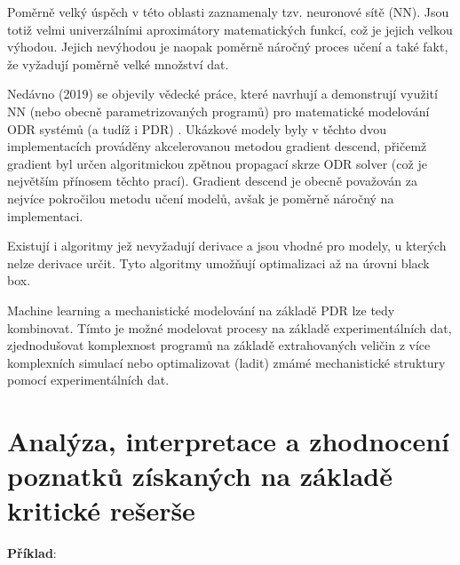 Poměrně velký úspěch v této oblasti zaznamenaly tzv. neuronové sítě (NN). Jsou
totiž velmi univerzálními aproximátory matematických funkcí, což je jejich
velkou výhodou. Jejich nevýhodou je naopak poměrně náročný proces učení a také
fakt, že vyžadují poměrně velké množství dat.

Nedávno (2019) se objevily vědecké práce, které navrhují a demonstrují využití
NN (nebo obecně parametrizovaných programů) pro matematické modelování ODR
systémů (a tudíž i PDR) \cite{diffEqFlux2019, chen2018neural}. Ukázkové modely
byly v těchto dvou implementacích prováděny akcelerovanou metodou gradient
descend, přičemž gradient byl určen algoritmickou zpětnou propagací skrze ODR
solver (což je největším přínosem těchto prací). Gradient descend je obecně
považován za nejvíce pokročilou metodu učení modelů, avšak je poměrně náročný
na implementaci.

Existují i algoritmy jež nevyžadují derivace a jsou vhodné pro modely, u
kterých nelze derivace určit. Tyto algoritmy umožňují optimalizaci až na úrovni
black box.

Machine learning a mechanistické modelování na základě PDR lze tedy kombinovat.
Tímto je možné modelovat procesy na základě experimentálních dat, zjednodušovat
komplexnost programů na základě extrahovaných veličin z více komplexních
simulací nebo optimalizovat (ladit) zmámé mechanistické struktury pomocí
experimentálních dat.
\chapter{Analýza, interpretace a zhodnocení poznatků získaných na základě
kritické rešerše}
\textbf{Příklad}:
